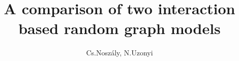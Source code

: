 \documentclass[final]{beamer}
\title{A comparison of two interaction based random graph models} %
\author{Cs.Noszály, N.Uzonyi} %
\institute{Faculty of Informatics, University of Debrecen} %
\newlength{\sepwid}
\newlength{\onecolwid}
\newlength{\twocolwid}
\begin{document}

\setlength{\belowcaptionskip}{2ex} %
\setlength\belowdisplayshortskip{2ex} %

\begin{frame}[t] %

\begin{columns}[t] %

\begin{column}{\sepwid}\end{column} %


\begin{column}{\twocolwid} %

\begin{columns}[t,totalwidth=\twocolwid] %

\begin{column}{\onecolwid}\vspace{-.6in} %







\end{column} %


\begin{column}{\onecolwid}\vspace{-.6in} %



  


\end{column}

\end{columns} %


\end{column}
\end{columns}
\end{frame}
\end{document}

